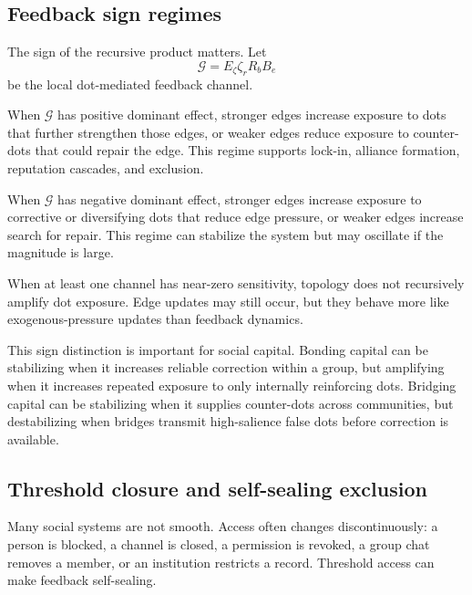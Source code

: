 \documentclass[11pt]{article}
\theoremstyle{remark}
\begin{document}
\subsection{Feedback sign regimes}\label{feedback-sign-regimes}

The sign of the recursive product matters. Let
\[
\mathcal G=E_\zeta \zeta_r R_b B_e
\]
be the local dot-mediated feedback channel.

\begin{description}[leftmargin=4cm,style=nextline]
\item[Reinforcing feedback]
When \(\mathcal G\) has positive dominant effect, stronger edges increase exposure to dots that further strengthen those edges, or weaker edges reduce exposure to counter-dots that could repair the edge. This regime supports lock-in, alliance formation, reputation cascades, and exclusion.

\item[Balancing feedback]
When \(\mathcal G\) has negative dominant effect, stronger edges increase exposure to corrective or diversifying dots that reduce edge pressure, or weaker edges increase search for repair. This regime can stabilize the system but may oscillate if the magnitude is large.

\item[Broken feedback]
When at least one channel has near-zero sensitivity, topology does not recursively amplify dot exposure. Edge updates may still occur, but they behave more like exogenous-pressure updates than feedback dynamics.
\end{description}

This sign distinction is important for social capital. Bonding capital can be stabilizing when it increases reliable correction within a group, but amplifying when it increases repeated exposure to only internally reinforcing dots. Bridging capital can be stabilizing when it supplies counter-dots across communities, but destabilizing when bridges transmit high-salience false dots before correction is available.

\subsection{Threshold closure and self-sealing exclusion}\label{threshold-closure-self-sealing-exclusion}

Many social systems are not smooth. Access often changes discontinuously: a person is blocked, a channel is closed, a permission is revoked, a group chat removes a member, or an institution restricts a record. Threshold access can make feedback self-sealing.
\end{document}
